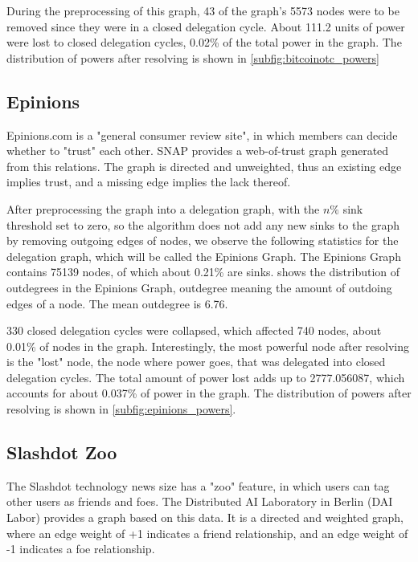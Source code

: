 During the preprocessing of this graph, 43 of the graph's 5573 nodes were to be removed since they were in a closed delegation cycle. About 111.2 units of power were lost to closed delegation cycles,  0.02\% of the total power in the graph. The distribution of powers after resolving is shown in \cref{subfig:bitcoinotc_powers}

\subsection{Epinions}

Epinions.com is a "general consumer review site", in which members can decide whether to "trust" each other. SNAP provides a web-of-trust graph generated from this relations. \cite{richardsonTrustManagementSemantic2003} The graph is directed and unweighted, thus an existing edge implies trust, and a missing edge implies the lack thereof.

After preprocessing the graph into a delegation graph, with the $n\%$ sink threshold set to zero, so the algorithm does not add any new sinks to the graph by removing outgoing edges of nodes, we observe the following statistics for the delegation graph, which will be called the Epinions Graph. The Epinions Graph contains 75139 nodes, of which about 0.21\% are sinks.  shows the distribution of outdegrees in the Epinions Graph, outdegree meaning the amount of outdoing edges of a node. The mean outdegree is 6.76.

330 closed delegation cycles were collapsed, which affected 740 nodes, about 0.01\% of nodes in the graph. Interestingly, the most powerful node after resolving is the "lost" node, the node where power goes, that was delegated into closed delegation cycles. The total amount of power lost adds up to 2777.056087, which accounts for about 0.037\% of power in the graph. The distribution of powers after resolving is shown in \cref{subfig:epinions_powers}.

\subsection{Slashdot Zoo}

The Slashdot technology news size has a "zoo" feature, in which users can tag other users as friends and foes. The Distributed AI Laboratory in Berlin (DAI Labor) provides a graph based on this data. \cite{kunegis2009a} It is a directed and weighted graph, where an edge weight of +1 indicates a friend relationship, and an edge weight of -1 indicates a foe relationship.


